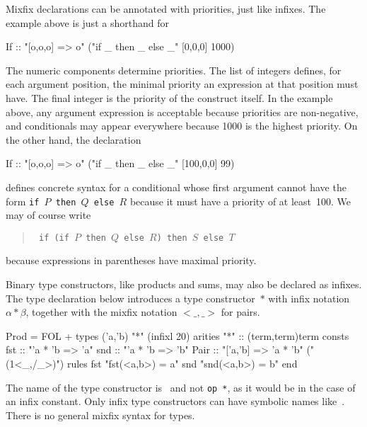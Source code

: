 Mixfix declarations can be annotated with priorities, just like
infixes.  The example above is just a shorthand for
\begin{ttbox}
        If :: "[o,o,o] => o"       ("if _ then _ else _" [0,0,0] 1000)
\end{ttbox}
The numeric components determine priorities.  The list of integers
defines, for each argument position, the minimal priority an expression
at that position must have.  The final integer is the priority of the
construct itself.  In the example above, any argument expression is
acceptable because priorities are non-negative, and conditionals may
appear everywhere because 1000 is the highest priority.  On the other
hand, the declaration
\begin{ttbox}
        If :: "[o,o,o] => o"       ("if _ then _ else _" [100,0,0] 99)
\end{ttbox}
defines concrete syntax for a conditional whose first argument cannot have
the form {\tt if~$P$ then~$Q$ else~$R$} because it must have a priority
of at least~100.  We may of course write
\begin{quote}\tt
if (if $P$ then $Q$ else $R$) then $S$ else $T$
\end{quote}
because expressions in parentheses have maximal priority.  

Binary type constructors, like products and sums, may also be declared as
infixes.  The type declaration below introduces a type constructor~$*$ with
infix notation $\alpha*\beta$, together with the mixfix notation
${<}\_,\_{>}$ for pairs.  
\begin{ttbox}
Prod = FOL +
types   ('a,'b) "*"                           (infixl 20)
arities "*"     :: (term,term)term
consts  fst     :: "'a * 'b => 'a"
        snd     :: "'a * 'b => 'b"
        Pair    :: "['a,'b] => 'a * 'b"       ("(1<_,/_>)")
rules   fst     "fst(<a,b>) = a"
        snd     "snd(<a,b>) = b"
end
\end{ttbox}

\begin{warn}
The name of the type constructor is~{\tt *} and not {\tt op~*}, as it would
be in the case of an infix constant.  Only infix type constructors can have
symbolic names like~{\tt *}.  There is no general mixfix syntax for types.
\end{warn}


